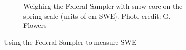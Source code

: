 \documentclass[12pt]{article}
\begin{document}
\begin{figure}
\begin{subfigure}[b]{0.56\textwidth}
        \caption{Weighing the Federal Sampler with snow core on the spring scale (units of cm SWE). Photo credit: G. Flowers}
        \label{photo_swe2}
    \end{subfigure}

    \caption{Using the Federal Sampler to measure SWE}
    \label{photo_swe}
\end{figure}
 
	



\end{document}
